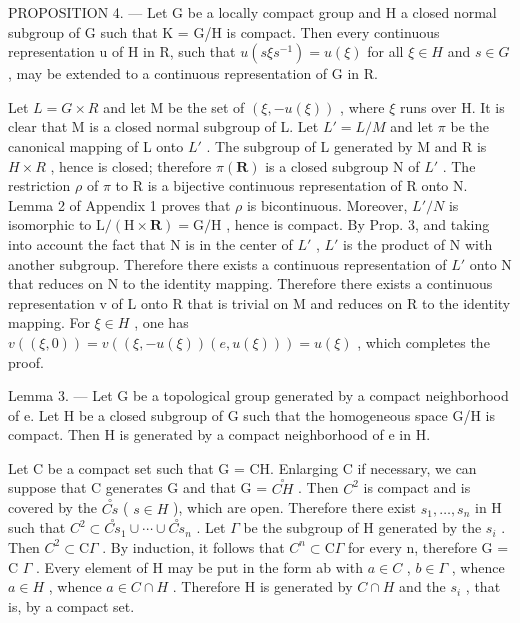 PROPOSITION 4. --- Let G be a locally compact group and H a closed normal subgroup of G such that K = G/H is compact. Then every continuous representation u of H in R, such that \(u(s\xi s^{-1}) = u(\xi)\) for all \(\xi \in H\) and \(s \in G\) , may be extended to a continuous representation of G in R.

Let \(L = G \times R\) and let M be the set of \((\xi, -u(\xi))\) , where \(\xi\) runs over H. It is clear that M is a closed normal subgroup of L. Let \(L' = L/M\) and let \(\pi\) be the canonical mapping of L onto \(L'\) . The subgroup of L generated by M and R is \(H \times R\) , hence is closed; therefore \(\pi(\mathbf{R})\) is a closed subgroup N of \(L'\) . The restriction \(\rho\) of \(\pi\) to R is a bijective continuous representation of R onto N. Lemma 2 of Appendix 1 proves that \(\rho\) is bicontinuous. Moreover, \(L'/N\) is isomorphic to \(\mathrm{L}/(\mathrm{H} \times \mathbf{R}) = \mathrm{G}/\mathrm{H}\) , hence is compact. By Prop. 3, and taking into account the fact that N is in the center of \(L'\) , \(L'\) is the product of N with another subgroup. Therefore there exists a continuous representation of \(L'\) onto N that reduces on N to the identity mapping. Therefore there exists a continuous representation v of L onto R that is trivial on M and reduces on R to the identity mapping. For \(\xi \in H\) , one has \(v((\xi,0)) = v((\xi,-u(\xi))(e,u(\xi))) = u(\xi)\) , which completes the proof.

Lemma 3. --- Let G be a topological group generated by a compact neighborhood of e. Let H be a closed subgroup of G such that the homogeneous space G/H is compact. Then H is generated by a compact neighborhood of e in H.

Let C be a compact set such that G = CH. Enlarging C if necessary, we can suppose that C generates G and that G = \(\overset{\circ}{CH}\) . Then \(C^{2}\) is compact and is covered by the \(\overset{\circ}{Cs}\) ( \(s \in H\) ), which are open. Therefore there exist \(s_{1}, \ldots, s_{n}\) in H such that \(C^{2} \subset \overset{\circ}{Cs}_{1} \cup \cdots \cup \overset{\circ}{Cs}_{n}\) . Let \(\Gamma\) be the subgroup of H generated by the \(s_{i}\) . Then \(C^{2} \subset \mathrm{C}\Gamma\) . By induction, it follows that \(C^{n} \subset \mathrm{C}\Gamma\) for every n, therefore G = C \(\Gamma\) . Every element of H may be put in the form ab with \(a \in C\) , \(b \in \Gamma\) , whence \(a \in H\) , whence \(a \in C \cap H\) . Therefore H is generated by \(C \cap H\) and the \(s_{i}\) , that is, by a compact set.

